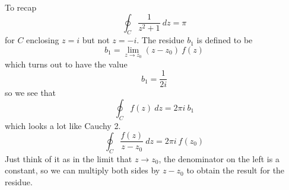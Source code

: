 \documentclass[11pt, oneside]{article}   	%
\begin{document}
To recap
\[  \oint_C \frac{1}{z^2 + 1} \ dz = \pi \]
for $C$ enclosing $z=i$ but not $z = -i$.
The residue $b_1$ is defined to be
\[ b_1 = \lim_{z \rightarrow z_0} (z-z_0) \ f(z)  \]
which turns out to have the value
\[ b_1 = \frac{1}{2i} \]
so we see that 
\[ \oint_C f(z) \ dz = 2 \pi i \ b_1 \]
which looks a lot like Cauchy 2.
\[ \oint_C \frac{f(z)}{z - z_0} \ dz = 2 \pi i \ f(z_0) \]
Just think of it as in the limit that $z \rightarrow z_0$, the denominator on the left is a constant, so we can multiply both sides by $z - z_0$ to obtain the result for the residue.
\end{document}
